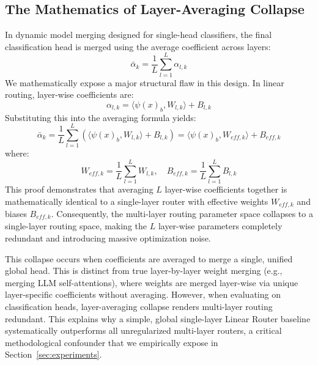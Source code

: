 \subsection{The Mathematics of Layer-Averaging Collapse}
\label{subsec:layer_avg_collapse}
In dynamic model merging designed for single-head classifiers, the final classification head is merged using the average coefficient across layers:
\begin{equation}
    \bar{\alpha}_k = \frac{1}{L} \sum_{l=1}^L \alpha_{l, k}
\end{equation}
We mathematically expose a major structural flaw in this design. In linear routing, layer-wise coefficients are:
\begin{equation}
    \alpha_{l, k} = \langle \psi(x)_b, W_{l, k} \rangle + B_{l, k}
\end{equation}
Substituting this into the averaging formula yields:
\begin{equation}
    \bar{\alpha}_k = \frac{1}{L} \sum_{l=1}^L \left( \langle \psi(x)_b, W_{l, k} \rangle + B_{l, k} \right) = \langle \psi(x)_b, W_{eff, k} \rangle + B_{eff, k}
\end{equation}
where:
\begin{equation}
    W_{eff, k} = \frac{1}{L} \sum_{l=1}^L W_{l, k}, \quad B_{eff, k} = \frac{1}{L} \sum_{l=1}^L B_{l, k}
\end{equation}
This proof demonstrates that averaging $L$ layer-wise coefficients together is mathematically identical to a single-layer router with effective weights $W_{eff, k}$ and biases $B_{eff, k}$. Consequently, the multi-layer routing parameter space collapses to a single-layer routing space, making the $L$ layer-wise parameters completely redundant and introducing massive optimization noise. 

This collapse occurs when coefficients are averaged to merge a single, unified global head. This is distinct from true layer-by-layer weight merging (e.g., merging LLM self-attentions), where weights are merged layer-wise via unique layer-specific coefficients without averaging. However, when evaluating on classification heads, layer-averaging collapse renders multi-layer routing redundant. This explains why a simple, global single-layer Linear Router baseline systematically outperforms all unregularized multi-layer routers, a critical methodological confounder that we empirically expose in Section~\ref{sec:experiments}.
